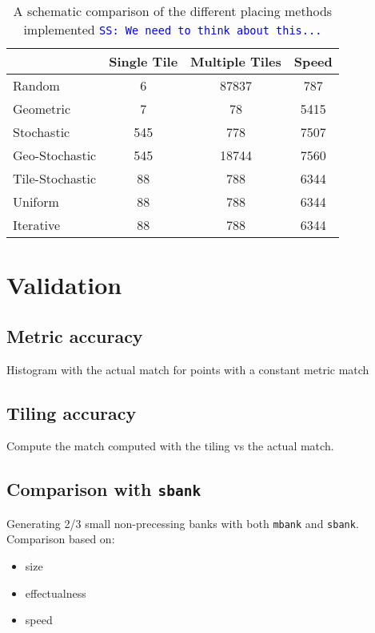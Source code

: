 \documentclass[twocolumn,showpacs,preprintnumbers,nofootinbib,prd,
superscriptaddress,10pt]{revtex4-1}
\newcommand{\stefano}[1]{{\textcolor{blue}{\texttt{SS: #1}} }}
\begin{document}
\begin{table}[t!]
	\centering
	 \begin{tabular}{l c c c} 
	 \hline
	 \phantom{Method} & Single Tile & Multiple Tiles & Speed \\
	 \hline
	 Random & 6 & 87837 & 787 \\ 
	 Geometric & 7 & 78 & 5415 \\
	 Stochastic & 545 & 778 & 7507 \\
	 Geo-Stochastic & 545 & 18744 & 7560 \\
	 Tile-Stochastic & 88 & 788 & 6344 \\ 
	 Uniform & 88 & 788 & 6344 \\ 
	 Iterative & 88 & 788 & 6344 \\ 
	 \hline
	 \end{tabular}
	 \caption{A schematic comparison of the different placing methods implemented \stefano{We need to think about this...}}
 	 \label{tab:placing_methods}
\end{table}

\section{Validation} \label{sec:validation}

\subsection{Metric accuracy} \label{sec:metric_accuracy}

Histogram with the actual match for points with a constant metric match

\subsection{Tiling accuracy} \label{sec:tiling_accuracy}

Compute the match computed with the tiling vs the actual match.

\subsection{Comparison with \texttt{sbank} }

Generating 2/3 small non-precessing banks with both \texttt{mbank} and \texttt{sbank}.
Comparison based on:
	\begin{itemize}
		\item size
		\item effectualness
		\item speed
	\end{itemize}
\end{document}
